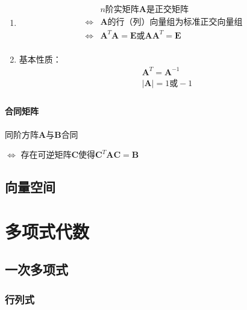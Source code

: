 \documentclass[12pt]{book}
\begin{document}
\begin{enumerate}[1.]
    \item \begin{align*}
                              & n\text{阶实矩阵}\bm{A}\text{是正交矩阵}               \\
              \Leftrightarrow & \bm{A} \text{的行（列）向量组为标准正交向量组}        \\
              \Leftrightarrow & \bm{A}^{T}\bm{A}=\bm{E}\text{或}\bm{A}\bm{A}^{T}=\bm{E} \\
          \end{align*}
    \item 基本性质：
          \begin{align*}
               & \bm{A}^T = \bm{A}^{-1} \\
               & |\bm{A}|=1\text{或}-1  \\
          \end{align*}
\end{enumerate}








\subsubsection{合同矩阵}

\par 同阶方阵$\bm{A}$与$\bm{B}$合同 
\par $\Leftrightarrow$ 存在可逆矩阵$\bm{C}$使得$\bm{C}^{T}\bm{A}\bm{C}=\bm{B}$









\section{向量空间}



\chapter{多项式代数}



\section{一次多项式}


\subsection{行列式}
\end{document}
